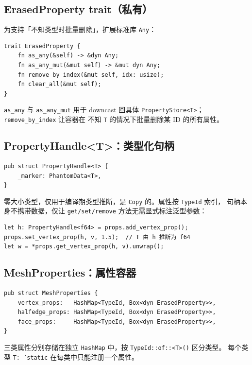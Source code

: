 \documentclass[11pt,a4paper]{article}
\begin{document}
\subsection{ErasedProperty trait（私有）}

为支持「不知类型时批量删除」，扩展标准库 \texttt{Any}：

\begin{lstlisting}
trait ErasedProperty {
    fn as_any(&self) -> &dyn Any;
    fn as_any_mut(&mut self) -> &mut dyn Any;
    fn remove_by_index(&mut self, idx: usize);
    fn clear_all(&mut self);
}
\end{lstlisting}

\texttt{as\_any} 与 \texttt{as\_any\_mut} 用于 downcast 回具体
\texttt{PropertyStore<T>}；\texttt{remove\_by\_index} 让容器在
不知 \texttt{T} 的情况下批量删除某 ID 的所有属性。

\subsection{PropertyHandle<T>：类型化句柄}

\begin{lstlisting}
pub struct PropertyHandle<T> {
    _marker: PhantomData<T>,
}
\end{lstlisting}

零大小类型，仅用于编译期类型推断，是 \texttt{Copy} 的。属性按 \texttt{TypeId} 索引，
句柄本身不携带数据，仅让 \texttt{get/set/remove} 方法无需显式标注泛型参数：

\begin{lstlisting}
let h: PropertyHandle<f64> = props.add_vertex_prop();
props.set_vertex_prop(h, v, 1.5);  // T 由 h 推断为 f64
let w = *props.get_vertex_prop(h, v).unwrap();
\end{lstlisting}

\subsection{MeshProperties：属性容器}

\begin{lstlisting}
pub struct MeshProperties {
    vertex_props:   HashMap<TypeId, Box<dyn ErasedProperty>>,
    halfedge_props: HashMap<TypeId, Box<dyn ErasedProperty>>,
    face_props:     HashMap<TypeId, Box<dyn ErasedProperty>>,
}
\end{lstlisting}

三类属性分别存储在独立 \texttt{HashMap} 中，按 \texttt{TypeId::of::<T>()} 区分类型。
每个类型 \texttt{T: 'static} 在每类中只能注册一个属性。
\end{document}
